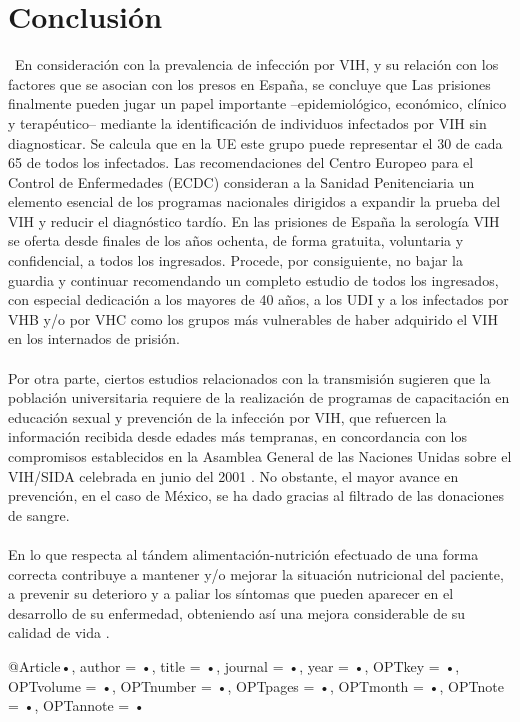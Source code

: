 \documentclass[a4paper,twocolumn,10pt]{article}
\begin{document}
\section{Conclusión}
\ En consideración con la prevalencia de infección por VIH, y su relación con los factores que se asocian con los presos en España, se concluye que Las prisiones finalmente pueden jugar un papel importante –epidemiológico, económico, clínico y  terapéutico– mediante la identificación de individuos infectados por VIH sin diagnosticar. Se calcula que en la UE este grupo puede representar el 30 de cada 65 de todos los infectados. Las recomendaciones del Centro Europeo para el Control de Enfermedades (ECDC) consideran a la Sanidad Penitenciaria un elemento esencial de los programas nacionales dirigidos a expandir la prueba del VIH y reducir el diagnóstico tardío. En las prisiones de España la serología VIH se oferta desde finales de los años ochenta, de forma gratuita, voluntaria y confidencial, a todos los ingresados. Procede, por consiguiente, no bajar la guardia y continuar recomendando un completo estudio de todos los ingresados, con especial dedicación a los mayores de 40 años, a los UDI y a los infectados por
VHB y/o por VHC como los grupos más vulnerables de haber adquirido el VIH en los internados de prisión. \cite{Marco2012}\\ \\
Por otra parte, ciertos estudios relacionados con la transmisión sugieren que la población universitaria requiere de la realización de programas de capacitación en educación sexual y prevención de la infección por VIH, que refuercen la información recibida desde edades más tempranas, en concordancia con los compromisos establecidos en la Asamblea  General de las Naciones Unidas sobre el VIH/SIDA celebrada en junio del 2001 \cite{LinaMariaVera2004}. No obstante, el mayor avance en prevención, en el  caso de México, se ha dado gracias al filtrado de las donaciones de sangre. \\ \\
En lo que respecta al tándem alimentación-nutrición efectuado de una forma correcta contribuye a mantener y/o mejorar la situación nutricional del paciente, a prevenir su deterioro y a paliar los síntomas que pueden aparecer en el desarrollo de su enfermedad, obteniendo así una mejora considerable de su calidad de vida \cite{Herrera2004}.

@Article{•,
author = {•},
title = {•},
journal = {•},
year = {•},
OPTkey = {•},
OPTvolume = {•},
OPTnumber = {•},
OPTpages = {•},
OPTmonth = {•},
OPTnote = {•},
OPTannote = {•}
}
\end{document}
